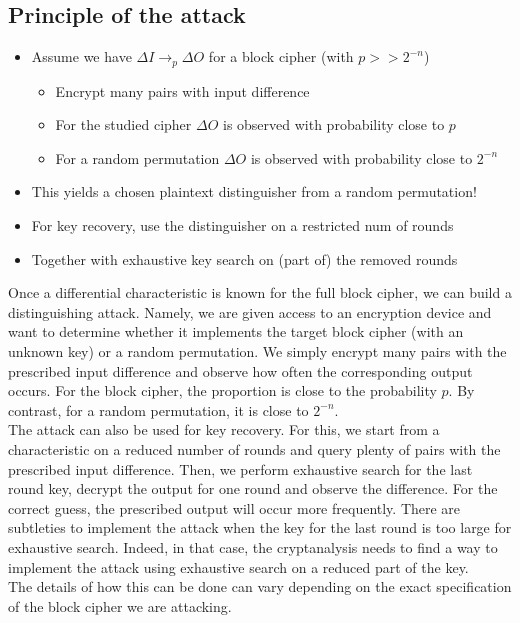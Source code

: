 	\subsection{Principle of the attack}
		\begin{itemize}
		    \item Assume we have $\Delta I \to_p \Delta O$ for a block cipher (with $p >> 2^{-n}$)
		    \begin{itemize}
		        \item Encrypt many pairs with input difference
		        \item For the studied cipher $\Delta O$ is observed with probability close to $p$
		        \item For a random permutation $\Delta O$ is observed with probability close to $2^{-n}$\\
		    \end{itemize}
		    \item This yields a chosen plaintext distinguisher from a random permutation!\\
		    \item For key recovery, use the distinguisher on a restricted num of rounds
		    \item Together with exhaustive key search on (part of) the removed rounds
		\end{itemize}
		Once a differential characteristic is known for the full block cipher, we can build a distinguishing attack. 
		Namely, we are given access to an encryption device and want to determine whether it implements the target block cipher (with an unknown key) or a random permutation. 
		We simply encrypt many pairs with the prescribed input difference and observe how often the corresponding output occurs. 
		For the block cipher, the proportion is close to the probability $p$. 
		By contrast, for a random permutation, it is close to $2^{-n}$.\\
		The attack can also be used for key recovery. 
		For this, we start from a characteristic on a reduced number of rounds and query plenty of pairs with the prescribed input difference. 
		Then, we perform exhaustive search for the last round key, decrypt the output for one round and observe the difference. 
		For the correct guess, the prescribed output will occur more frequently. 
		There are subtleties to implement the attack when the key for the last round is too large for exhaustive search. 
		Indeed, in that case, the cryptanalysis needs to find a way to implement the attack using exhaustive search on a reduced part of the key.\\
		The details of how this can be done can vary depending on the exact specification of the block cipher we are attacking.


